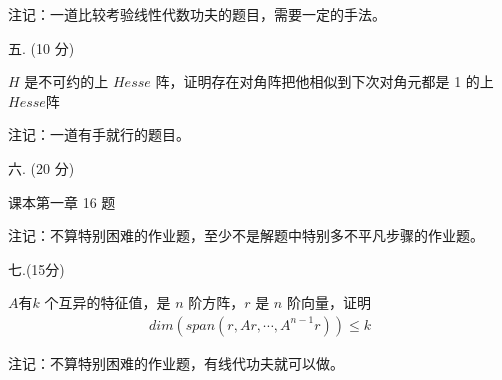\documentclass{article}
\begin{document}
注记：一道比较考验线性代数功夫的题目，需要一定的手法。

五. (10 分)

$H$ 是不可约的上 $Hesse$ 阵，证明存在对角阵把他相似到下次对角元都是 1 的上$ Hesse $阵

注记：一道有手就行的题目。

六.  (20 分)

课本第一章 16 题

注记：不算特别困难的作业题，至少不是解题中特别多不平凡步骤的作业题。

七.(15分)

$ A $有$ k$ 个互异的特征值，是 $n$ 阶方阵，$r$ 是 $n$ 阶向量，证明
$$
\begin{aligned}dim(span(r,Ar,\cdots,A^{n-1}r))\leq k\end{aligned}
$$

注记：不算特别困难的作业题，有线代功夫就可以做。
\end{document}
